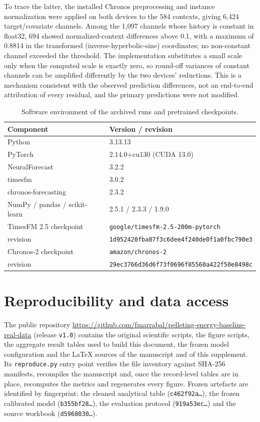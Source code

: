 \documentclass[11pt,a4paper]{article}
\begin{document}
To trace the latter, the installed Chronos preprocessing and instance normalization were applied on both devices to the 584 contexts, giving 6,424 target/covariate channels. Among the 1,097 channels whose history is constant in float32, 694 showed normalized-context differences above 0.1, with a maximum of 0.8814 in the transformed (inverse-hyperbolic-sine) coordinates; no non-constant channel exceeded the threshold. The implementation substitutes a small scale only when the computed scale is exactly zero, so round-off variances of constant channels can be amplified differently by the two devices' reductions. This is a mechanism consistent with the observed prediction differences, not an end-to-end attribution of every residual, and the primary predictions were not modified.





\begin{table}[!htbp]\centering\small
\caption{Software environment of the archived runs and pretrained checkpoints.}\label{tab:s_versions}
\begin{tabular}{@{}ll@{}}\toprule
Component & Version / revision \\\midrule
Python & 3.13.13 \\
PyTorch & 2.14.0+cu130 (CUDA 13.0) \\
NeuralForecast & 3.2.2 \\
timesfm & 3.0.2 \\
chronos-forecasting & 2.3.2 \\
NumPy / pandas / scikit-learn & 2.5.1 / 2.3.3 / 1.9.0 \\
TimesFM 2.5 checkpoint & \texttt{google/timesfm-2.5-200m-pytorch} \\
\quad revision & \texttt{1d952420fba87f3c6dee4f240de0f1a0fbc790e3} \\
Chronos-2 checkpoint & \texttt{amazon/chronos-2} \\
\quad revision & \texttt{29ec3766d36d6f73f0696f85560a422f50e8498c} \\\bottomrule
\end{tabular}
\end{table}
\FloatBarrier

\section{Reproducibility and data access}\label{sec:repro}
The public repository \url{https://github.com/fmarrabal/pelleting-energy-baseline-real-data} (release \texttt{v1.0}) contains the original scientific scripts, the figure scripts, the aggregate result tables used to build this document, the frozen model configuration and the LaTeX sources of the manuscript and of this supplement. Its \texttt{reproduce.py} entry point verifies the file inventory against SHA-256 manifests, recompiles the manuscript and, once the record-level tables are in place, recomputes the metrics and regenerates every figure. Frozen artefacts are identified by fingerprint: the cleaned analytical table (\texttt{c462f92a\ldots}), the frozen calibrated model (\texttt{b355bf28\ldots}), the evaluation protocol (\texttt{919a53ec\ldots}) and the source workbook (\texttt{d5968030\ldots}).
\end{document}

